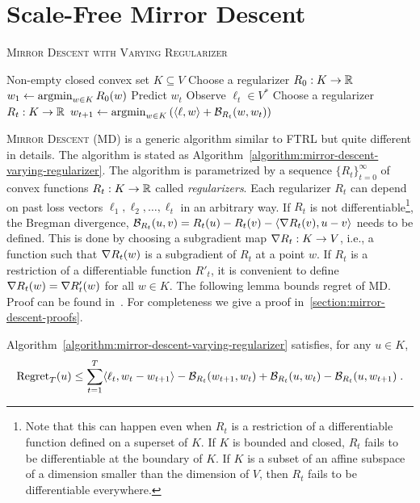\section{Scale-Free Mirror Descent}
\label{section:mirror-descent}

\begin{algorithm}[t]
\caption{\textsc{Mirror Descent with Varying Regularizer}}
\label{algorithm:mirror-descent-varying-regularizer}
\begin{algorithmic}[1]
\REQUIRE Non-empty closed convex set $K \subseteq V$
\STATE Choose a regularizer $R_0:K \to \mathbb{R}$
\STATE $w_1 \leftarrow \operatorname*{argmin}_{w \in K} R_0(w)$
\STATE Predict $w_t$
\STATE Observe $\ell_t \in V^*$
\STATE Choose a regularizer $R_t:K \to \mathbb{R}$
\STATE $w_{t+1} \leftarrow \operatorname*{argmin}_{w \in K} \left( \langle \ell, w \rangle + \mathcal{B}_{R_t}(w, w_t) \right)$
\ENDFOR
\end{algorithmic}
\end{algorithm}

\textsc{Mirror Descent} (MD) is a generic algorithm similar to \textsc{FTRL}
but quite different in details. The algorithm is stated as
Algorithm~\ref{algorithm:mirror-descent-varying-regularizer}. The algorithm is
parametrized by a sequence $\{R_t\}_{t=0}^\infty$ of convex functions $R_t:K
\to \mathbb{R}$ called \emph{regularizers}. Each regularizer $R_t$ can depend on past
loss vectors $\ell_1, \ell_2, \dots, \ell_t$ in an arbitrary way. If $R_t$ is
not differentiable\footnote{Note that this can happen even when $R_t$ is a
restriction of a differentiable function defined on a superset of $K$.  If $K$
is bounded and closed, $R_t$ fails to be differentiable at the boundary of $K$.
If $K$ is a subset of an affine subspace of a dimension smaller than the
dimension of $V$, then $R_t$ fails to be differentiable everywhere.}, the
Bregman divergence, $\mathcal{B}_{R_t}(u,v) = R_t(u) - R_t(v) - \langle \nabla R_t(v),
u - v \rangle$ needs to be defined. This is done by choosing a subgradient map
$\nabla R_t:K \to V$, i.e., a function such that $\nabla R_t(w)$ is a subgradient
of $R_t$ at a point $w$. If $R_t$ is a restriction of a differentiable function
$R'_t$, it is convenient to define $\nabla R_t(w) = \nabla R'_t(w)$ for all $w
\in K$. The following lemma bounds regret of \textsc{MD}.  Proof can be found
in~\cite{Rakhlin-Sridharan-2009,Duchi-Shalev-Shwartz-Singer-Tewari-2010}.  For
completeness we give a proof in~\ref{section:mirror-descent-proofs}.

\begin{lemma}
\label{lemma:mirror-descent-regret}
Algorithm~\ref{algorithm:mirror-descent-varying-regularizer} satisfies, for any
$u \in K$,
$$
\operatorname{Regret}_T(u)
\le
\sum_{t=1}^T \langle \ell_t, w_t - w_{t+1} \rangle - \mathcal{B}_{R_t}(w_{t+1}, w_t) + \mathcal{B}_{R_t}(u,w_t) - \mathcal{B}_{R_t}(u, w_{t+1}) \; .
$$
\end{lemma}

